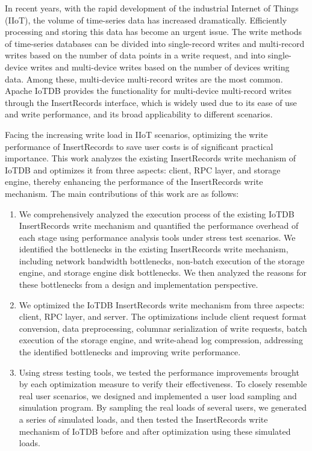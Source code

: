 \begin{abstract*}

  In recent years, with the rapid development of the industrial Internet of Things (IIoT), the volume of time-series data has increased dramatically. Efficiently processing and storing this data has become an urgent issue. The write methods of time-series databases can be divided into single-record writes and multi-record writes based on the number of data points in a write request, and into single-device writes and multi-device writes based on the number of devices writing data. Among these, multi-device multi-record writes are the most common. Apache IoTDB provides the functionality for multi-device multi-record writes through the InsertRecords interface, which is widely used due to its ease of use and write performance, and its broad applicability to different scenarios.

Facing the increasing write load in IIoT scenarios, optimizing the write performance of InsertRecords to save user costs is of significant practical importance. This work analyzes the existing InsertRecords write mechanism of IoTDB and optimizes it from three aspects: client, RPC layer, and storage engine, thereby enhancing the performance of the InsertRecords write mechanism. The main contributions of this work are as follows:
\begin{enumerate}
  \item We comprehensively analyzed the execution process of the existing IoTDB InsertRecords write mechanism and quantified the performance overhead of each stage using performance analysis tools under stress test scenarios. We identified the bottlenecks in the existing InsertRecords write mechanism, including network bandwidth bottlenecks, non-batch execution of the storage engine, and storage engine disk bottlenecks. We then analyzed the reasons for these bottlenecks from a design and implementation perspective.
  \item We optimized the IoTDB InsertRecords write mechanism from three aspects: client, RPC layer, and server. The optimizations include client request format conversion, data preprocessing, columnar serialization of write requests, batch execution of the storage engine, and write-ahead log compression, addressing the identified bottlenecks and improving write performance.
  \item Using stress testing tools, we tested the performance improvements brought by each optimization measure to verify their effectiveness. To closely resemble real user scenarios, we designed and implemented a user load sampling and simulation program. By sampling the real loads of several users, we generated a series of simulated loads, and then tested the InsertRecords write mechanism of IoTDB before and after optimization using these simulated loads.
\end{enumerate}


\end{abstract*}
